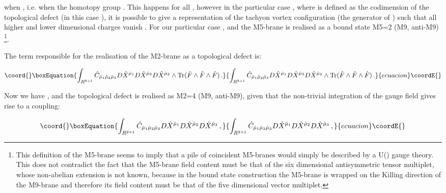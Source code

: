 \documentclass[12pt,a4paper]{article}
\begin{document}
\noindent when
\coordHE{},
i.e. when the homotopy group \coordHE{}. This happens 
for all \coordHE{}, however in the particular
case \coordHE{}, where \coordHE{} is defined as the codimension of the
topological defect (in this case \coordHE{}), it is possible to give a 
representation of the tachyon vortex configuration (the generator of
\coordHE{}) such that all higher and lower dimensional charges
vanish \cite{Witten}.
For our particular case \coordHE{}, and the 
M5-brane is realised as a bound state 
M5=2 (M9, anti-M9) \footnote{This definition
of the M5-brane seems to imply 
that a pile of coincident M5-branes would simply be described by a U(\coordHE{}) gauge
theory. This does not contradict the fact that the M5-brane field
content must be that of the six dimensional antisymmetric tensor
multiplet, whose non-abelian extension is not known, because 
in the bound state construction the
M5-brane is wrapped on the Killing direction of the M9-brane
and therefore its field content must be that of the five dimensional vector
multiplet.}.

The term responsible for the realisation of the M2-brane as a 
topological defect is: 

\begin{equation}\coord{}\boxEquation{
\int_{R^{8+1}} {\hat C}_{{\hat \mu}_1{\hat \mu}_2{\hat \mu}_3}
D{\hat X}^{{\hat \mu}_1}D{\hat X}^{{\hat \mu}_2}D{\hat X}^{{\hat \mu}_3}
\wedge {\rm Tr}({\hat F}\wedge {\hat F}\wedge {\hat F})\, .
}{
\int_{R^{8+1}} {\hat C}_{{\hat \mu}_1{\hat \mu}_2{\hat \mu}_3}
D{\hat X}^{{\hat \mu}_1}D{\hat X}^{{\hat \mu}_2}D{\hat X}^{{\hat \mu}_3}
\wedge {\rm Tr}({\hat F}\wedge {\hat F}\wedge {\hat F})\, .
}{ecuacion}\coordE{}\end{equation}

\noindent Now we have \coordHE{}, and the topological defect
is realised as M2=4 (M9, anti-M9), given that the non-trivial integration
of the gauge field gives rise to a coupling:

\begin{equation}\coord{}\boxEquation{
\int_{R^{2+1}}{\hat C}_{{\hat \mu}_1{\hat \mu}_2{\hat \mu}_3}
D{\hat X}^{{\hat \mu}_1}D{\hat X}^{{\hat \mu}_2}
D{\hat X}^{{\hat \mu}_3}\, ,
}{
\int_{R^{2+1}}{\hat C}_{{\hat \mu}_1{\hat \mu}_2{\hat \mu}_3}
D{\hat X}^{{\hat \mu}_1}D{\hat X}^{{\hat \mu}_2}
D{\hat X}^{{\hat \mu}_3}\, ,
}{ecuacion}\coordE{}\end{equation}
\end{document}
